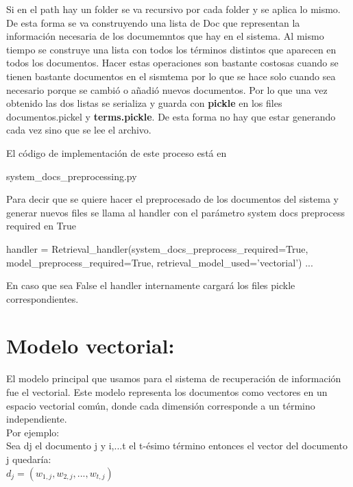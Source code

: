 \documentclass{llncs}
\begin{document}
Si en el path hay un folder se va recursivo por cada folder y se aplica lo mismo. De esta forma se va
construyendo una lista de Doc que representan la información necesaria de los documemntos que hay en el 
sistema. Al mismo tiempo se construye una lista con todos los términos distintos que aparecen en todos 
los documentos. Hacer estas operaciones son bastante costosas cuando se tienen bastante documentos en 
el sismtema por lo que se hace solo cuando sea necesario porque se cambió o añadió nuevos documentos.
Por lo que una vez obtenido las dos listas se serializa y guarda con \textbf{pickle} en los files 
{documentos.pickel} y \textbf{terms.pickle}. De esta forma no hay que estar generando cada vez sino que
se lee el archivo.

El código de implementación de este proceso está en 
\begin{python}
    system_docs_preprocessing.py
\end{python}

Para decir que se quiere hacer el preprocesado de los documentos del sistema y generar nuevos files 
se llama al handler con el parámetro system docs preprocess required en True
\begin{python}
handler =  Retrieval_handler(system_docs_preprocess_required=True,
     model_preprocess_required=True, retrieval_model_used='vectorial')
    ...
\end{python}

En caso que sea False el handler internamente cargará los files pickle correspondientes.


\section{Modelo vectorial:}
El modelo principal que usamos para el sistema de recuperación de información fue el vectorial.
Este modelo representa los documentos como vectores en un espacio vectorial común, donde cada 
dimensión corresponde a un término independiente. \\
Por ejemplo: \\
Sea dj el documento j y i,...t el t-ésimo término entonces el vector del documento j quedaría:\\
$
    d_j = (w_{1,j}, w_{2,j}, ..., w_{t,j})
$
\end{document}
